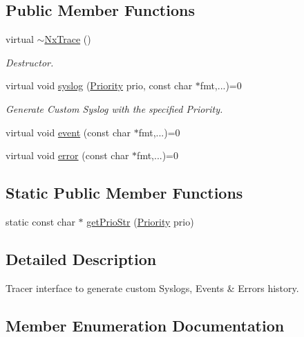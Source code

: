 \subsection*{Public Member Functions}
\begin{DoxyCompactItemize}
\item 
virtual \mbox{\hyperlink{classnxos_1_1_nx_trace_a4b8ef9990a168effbca47f29d9b6ea9d}{$\sim$\+Nx\+Trace}} ()
\begin{DoxyCompactList}\small\item\em Destructor. \end{DoxyCompactList}\item 
virtual void \mbox{\hyperlink{classnxos_1_1_nx_trace_a825db76787da234b99e81adb2def8d3d}{syslog}} (\mbox{\hyperlink{classnxos_1_1_nx_trace_a582f6e5a22e788c61807657f8bca088f}{Priority}} prio, const char $\ast$fmt,...)=0
\begin{DoxyCompactList}\small\item\em Generate Custom Syslog with the specified Priority. \end{DoxyCompactList}\item 
virtual void \mbox{\hyperlink{classnxos_1_1_nx_trace_a22e5e2fff39fae68fba3051dc2720621}{event}} (const char $\ast$fmt,...)=0
\item 
virtual void \mbox{\hyperlink{classnxos_1_1_nx_trace_afc0240b6b9a291729836ffb2fbeef8a4}{error}} (const char $\ast$fmt,...)=0
\end{DoxyCompactItemize}
\subsection*{Static Public Member Functions}
\begin{DoxyCompactItemize}
\item 
static const char $\ast$ \mbox{\hyperlink{classnxos_1_1_nx_trace_a583b8a49a2111e4e4b8ef2f2eeaa4620}{get\+Prio\+Str}} (\mbox{\hyperlink{classnxos_1_1_nx_trace_a582f6e5a22e788c61807657f8bca088f}{Priority}} prio)
\end{DoxyCompactItemize}


\subsection{Detailed Description}
Tracer interface to generate custom Syslogs, Events \& Errors history. 

\subsection{Member Enumeration Documentation}
\mbox{\label{classnxos_1_1_nx_trace_a582f6e5a22e788c61807657f8bca088f}} 
